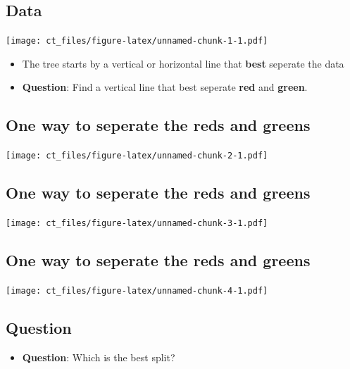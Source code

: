 \documentclass[
]{article}
\providecommand{\tightlist}{%
  \setlength{\itemsep}{0pt}\setlength{\parskip}{0pt}}
\begin{document}
\hypertarget{data}{%
\subsection{Data}\label{data}}

\texttt{[image: ct\_files/figure-latex/unnamed-chunk-1-1.pdf]}

\begin{itemize}
\tightlist
\item
  The tree starts by a vertical or horizontal line that \textbf{best}
  seperate the data
\item
  \textbf{Question}: Find a vertical line that best seperate
  \textbf{red} and \textbf{green}.
\end{itemize}

\hypertarget{one-way-to-seperate-the-reds-and-greens}{%
\subsection{One way to seperate the reds and
greens}\label{one-way-to-seperate-the-reds-and-greens}}

\texttt{[image: ct\_files/figure-latex/unnamed-chunk-2-1.pdf]}

\hypertarget{one-way-to-seperate-the-reds-and-greens-1}{%
\subsection{One way to seperate the reds and
greens}\label{one-way-to-seperate-the-reds-and-greens-1}}

\texttt{[image: ct\_files/figure-latex/unnamed-chunk-3-1.pdf]}

\hypertarget{one-way-to-seperate-the-reds-and-greens-2}{%
\subsection{One way to seperate the reds and
greens}\label{one-way-to-seperate-the-reds-and-greens-2}}

\texttt{[image: ct\_files/figure-latex/unnamed-chunk-4-1.pdf]}

\hypertarget{question}{%
\subsection{Question}\label{question}}

\begin{itemize}
\tightlist
\item
  \textbf{Question}: Which is the best split?
\end{itemize}
\end{document}
